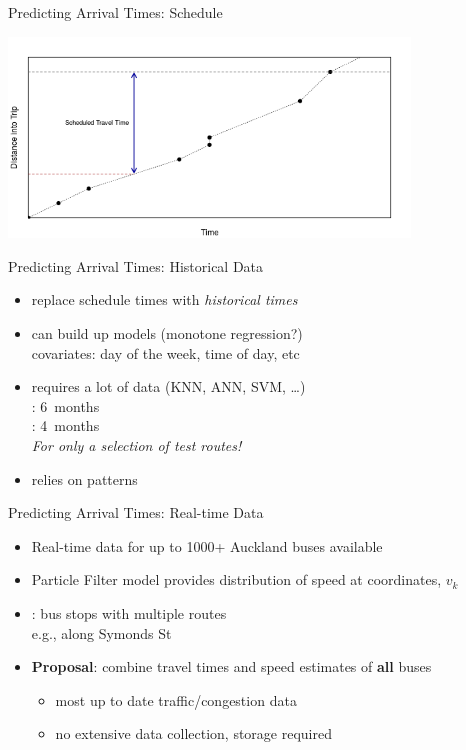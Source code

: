 \documentclass[10pt,t]{beamer}
\begin{document}
\begin{frame}{Predicting Arrival Times: Schedule}
\begin{overprint}
    \centering
    \includegraphics[width=0.8\textwidth]{figs/pred-sched-frame4.png}
  \end{overprint}

  \onslide<+->
\end{frame}


\begin{frame}{Predicting Arrival Times: Historical Data}
  \onslide<+->

  \begin{itemize}
  \item replace schedule times with \emph{historical times}
  \item can build up models (monotone regression?)\\
    covariates: day of the week, time of day, etc
  \item requires a lot of data (KNN, ANN, SVM, \ldots)\\
    \cite{mazloumi-etal:2011}: 6~months\\
    \cite{chen-rakha:2014}: 4~months \\
    \emph{For only a selection of test routes!}
  \item relies on patterns
  \end{itemize}
\end{frame}


\begin{frame}{Predicting Arrival Times: Real-time Data}  
  \begin{itemize}
  \item Real-time data for up to 1000+ Auckland buses available
  \item Particle Filter model provides distribution of speed at coordinates, $v_k$
  \item \cite{yu-etal:2011}: bus stops with multiple routes\\
    e.g., along Symonds St
  
    \vspace{1em}
  \item<2-> \textbf{Proposal}: combine travel times and speed estimates of \textbf{all} buses
    \begin{itemize}
    \item most up to date traffic/congestion data
    \item no extensive data collection, storage required
    \end{itemize}
  \end{itemize}
\end{frame}
\end{document}
